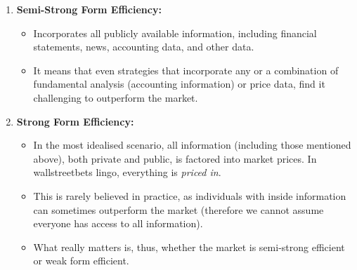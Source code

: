 \begin{itemize}
\begin{enumerate}
        \item \textbf{Semi-Strong Form Efficiency: } 
        \begin{itemize}
            \item Incorporates all publicly available information, including financial statements, news, accounting data, and other data.
            \item It means that even strategies that incorporate any or a combination of fundamental analysis (accounting information) or price data, find it challenging  to outperform the market.
        \end{itemize}
        \item \textbf{Strong Form Efficiency: }
        \begin{itemize}
            \item In the most idealised scenario, all information (including those mentioned above), both private and public, is factored into market prices. In wallstreetbets lingo, everything is \textit{priced in}.
            \item This is rarely believed in practice, as individuals with inside information can sometimes outperform the market (therefore we cannot assume everyone has access to all information).
            \item What really matters is, thus, whether the market is
            semi-strong efficient or weak form efficient.
        \end{itemize} 
    \end{enumerate}

\end{itemize}


